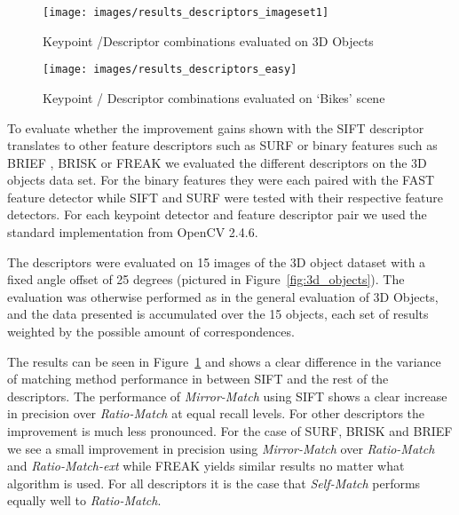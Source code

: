 \documentclass[journal]{IEEEtran}
\begin{document}
\begin{figure*}[t!]
    \begin{subfigure}[t]{1\textwidth}
        \centering
        \texttt{[image: images/results\_descriptors\_imageset1]}
        \caption{Keypoint /Descriptor combinations evaluated on 3D 
        Objects}
        \label{fig:descriptors}
    \end{subfigure}%

    \begin{subfigure}[t]{1\textwidth}
        \centering
        \texttt{[image: images/results\_descriptors\_easy]}
        \caption{Keypoint / Descriptor combinations evaluated on `Bikes' 
        scene}
        \label{fig:descriptors_easy}
    \end{subfigure}%
    \caption{a) Keypoint / Descriptor combinations measured on 15 pairs 
    of photos of 3D objects taken 15 degrees apart. K = Keypoint, D = 
Descriptor\. b) Same experiment evaluated on a simple to match image 
pair; image 1 and 3 in the `Bikes' scene from Mikolaczyk and Schmid's 
review of descriptors \cite{mikolajczyk2005performance}.}
\end{figure*}

To evaluate whether the improvement gains shown with the SIFT descriptor 
translates to other feature descriptors such as SURF \cite{bay2006surf} 
or binary features such as BRIEF \cite{calonder2010brief}, BRISK 
\cite{leutenegger2011brisk} or FREAK \cite{alahi2012freak} we evaluated 
the different descriptors on the 3D objects data set.  For the binary 
features they were each paired with the FAST feature detector while SIFT 
and SURF were tested with their respective feature detectors.  For each 
keypoint detector and feature descriptor pair we used the standard 
implementation from OpenCV 2.4.6.

The descriptors were evaluated on 15 images of the 3D object dataset 
with a fixed angle offset of 25 degrees (pictured in 
Figure~\ref{fig:3d_objects}).  The evaluation was otherwise performed as
in the general evaluation of 3D Objects, and the data presented is 
accumulated over the 15 objects, each set of results weighted by the 
possible amount of correspondences.

The results can be seen in Figure~\ref{fig:descriptors} and shows a 
clear difference in the variance of matching method performance in 
between SIFT and the rest of the descriptors. The performance of 
\emph{Mirror-Match} using SIFT shows a clear increase in precision over 
\emph{Ratio-Match} at equal recall levels. For other descriptors the 
improvement is much less pronounced.  For the case of SURF, BRISK and 
BRIEF we see a small improvement in precision using \emph{Mirror-Match} 
over \emph{Ratio-Match} and \emph{Ratio-Match-ext} while FREAK yields 
similar results no matter what algorithm is used. For all descriptors it 
is the case that \emph{Self-Match} performs equally well to 
\emph{Ratio-Match}.
\end{document}

